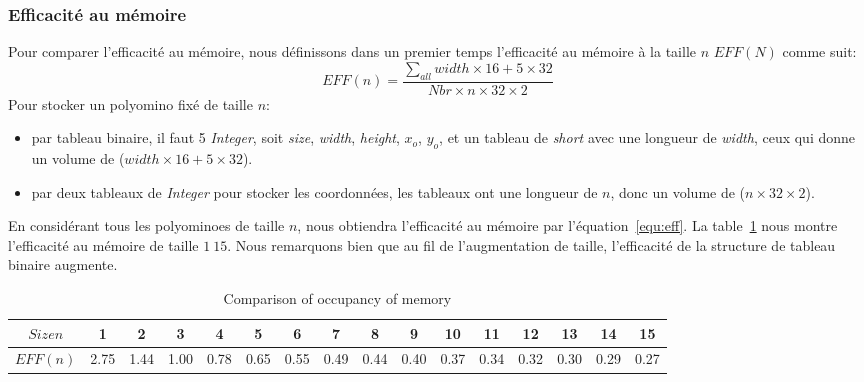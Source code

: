 \documentclass[a4paper,12pt]{article}
\begin{document}
	\subsubsection{Efficacité au mémoire}
	\par Pour comparer l'efficacité au mémoire, nous définissons dans un premier temps l'efficacité au mémoire à la taille $n$ $EFF(N)$ comme suit:\\
	\begin{equation}
	EFF(n) = \frac{\sum_{all}width\times 16+5\times 32}{Nbr \times n \times 32 \times 2}
	\label{equ:eff}
	\end{equation}
	Pour stocker un polyomino fixé de taille $n$:
	\begin{itemize}
		\item par tableau binaire, il faut 5 \textit{Integer}, soit \textit{size}, \textit{width}, \textit{height}, $x_o$, $y_o$, et un tableau de \textit{short} avec une longueur de \textit{width}, ceux qui donne un volume de (\textbf{$width\times 16+5\times 32$}).
		\item par deux tableaux de \textit{Integer} pour stocker les coordonnées, les tableaux ont une longueur de $n$, donc un volume de ($n\times32\times2$).
	\end{itemize}
	En considérant tous les polyominoes de taille $n$, nous obtiendra l'efficacité au mémoire par l'équation~\ref{equ:eff}. La table~\ref{table:memory} nous montre l'efficacité au mémoire de taille $1~15$. Nous remarquons bien que au fil de l'augmentation de taille, l'efficacité de la structure de tableau binaire augmente.
	\begin{table}[h]
		\centering
		\small
		\caption{Comparison of occupancy of memory}
		\tabcolsep=0.11cm
		\begin{tabular}{c|ccccccccccccccc}
			\hline\hline
			$Size n$&1&2&3&4&5&6&7&8&9&10&11&12&13&14&15\\
			\hline
			$EFF(n)$ &2.75&1.44&1.00&0.78&0.65&0.55&0.49&0.44&0.40&0.37&0.34&0.32&0.30&0.29&0.27\\
			\hline
		\end{tabular}
		\label{table:memory}
	\end{table}
	
\end{document}
